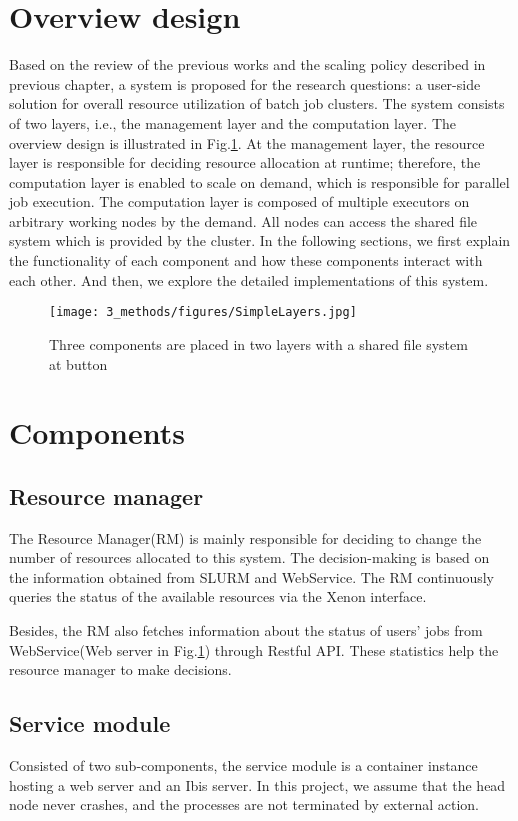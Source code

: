 \section{Overview design}
Based on the review of the previous works and the scaling policy described in previous chapter, a system is proposed for the research questions: a user-side solution for overall resource utilization of batch job clusters.
The system consists of two layers, i.e., the management layer and the computation layer. The overview design is illustrated in Fig.\ref{3_methods/figures/SimpleLayers.jpg}. 
At the management layer, the resource layer is responsible for deciding resource allocation at runtime; 
therefore, the computation layer is enabled to scale on demand, which is responsible for parallel job execution. 
The computation layer is composed of multiple executors on arbitrary working nodes by the demand. 
All nodes can access the shared file system which is provided by the cluster. 
In the following sections, we first explain the functionality of each component and how these components interact with each other. 
And then, we explore the detailed implementations of this system.

\begin{figure}
  \centering
  \texttt{[image: 3\_methods/figures/SimpleLayers.jpg]}
  \caption[Layers and components]{Three components are placed in two layers with a shared file system at button}
  \label{3_methods/figures/SimpleLayers.jpg}
\end{figure}

\section{Components}
\subsection{Resource manager}
The Resource Manager(RM) is mainly responsible for deciding to change the number of resources allocated to this system. 
The decision-making is based on the information obtained from SLURM and WebService. 
The RM continuously queries the status of the available resources via the Xenon interface.

Besides, the RM also fetches information about the status of users’ jobs from WebService(Web server in Fig.\ref{3_methods/figures/SimpleLayers.jpg}) through Restful API. 
These statistics help the resource manager to make decisions.

\subsection{Service module}
Consisted of two sub-components, the service module is a container instance hosting a web server and an Ibis server. 
In this project, we assume that the head node never crashes, and the processes are not terminated by external action.

